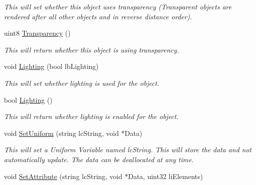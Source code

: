 \begin{DoxyCompactItemize}
\begin{DoxyCompactList}\small\item\em This will set whether this object uses transparency (Transparent objects are rendered after all other objects and in reverse distance order). \end{DoxyCompactList}\item 
\hypertarget{classc_render_object_adaf6cbdf9992883335faa1c906436221}{
uint8 \hyperlink{classc_render_object_adaf6cbdf9992883335faa1c906436221}{Transparency} ()}
\label{classc_render_object_adaf6cbdf9992883335faa1c906436221}

\begin{DoxyCompactList}\small\item\em This will return whether this object is using transparency. \end{DoxyCompactList}\item 
\hypertarget{classc_render_object_a67191d0fe8aceaa10052a542b3c34650}{
void \hyperlink{classc_render_object_a67191d0fe8aceaa10052a542b3c34650}{Lighting} (bool lbLighting)}
\label{classc_render_object_a67191d0fe8aceaa10052a542b3c34650}

\begin{DoxyCompactList}\small\item\em This will set whether lighting is used for the object. \end{DoxyCompactList}\item 
\hypertarget{classc_render_object_a11fd3f36150b07198b069d8d9461b370}{
bool \hyperlink{classc_render_object_a11fd3f36150b07198b069d8d9461b370}{Lighting} ()}
\label{classc_render_object_a11fd3f36150b07198b069d8d9461b370}

\begin{DoxyCompactList}\small\item\em This will return whether lighting is enabled for the object. \end{DoxyCompactList}\item 
\hypertarget{classc_render_object_afd82d3c16f9f42165e94c343eb6c671e}{
void \hyperlink{classc_render_object_afd82d3c16f9f42165e94c343eb6c671e}{SetUniform} (string lcString, void $\ast$Data)}
\label{classc_render_object_afd82d3c16f9f42165e94c343eb6c671e}

\begin{DoxyCompactList}\small\item\em This will set a Uniform Variable named lcString. This will store the data and not automatically update. The data can be deallocated at any time. \end{DoxyCompactList}\item 
\hypertarget{classc_render_object_a3b22fe9279c0fe21c28f65c3777318aa}{
void \hyperlink{classc_render_object_a3b22fe9279c0fe21c28f65c3777318aa}{SetAttribute} (string lcString, void $\ast$Data, uint32 liElements)}
\label{classc_render_object_a3b22fe9279c0fe21c28f65c3777318aa}


\end{DoxyCompactItemize}
